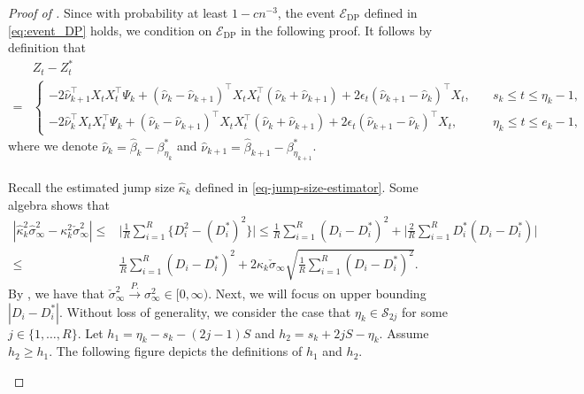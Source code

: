 \documentclass[11pt]{article}
\theoremstyle{plain}
\theoremstyle{definition}
\begin{document}
\begin{proof}[Proof of ]
Since with probability at least $1 - cn^{-3}$, the event $\mathcal{E}_{\mathrm{DP}}$ defined in \eqref{eq:event_DP} holds, we condition on $\mathcal{E}_{\mathrm{DP}}$ in the following proof. 
It follows by definition that
\begin{align*}
    &Z_t - Z_t^*\\
    =& \begin{cases}
         -2\widehat{ \nu}_{k+1}^{\top}X_tX_t^{\top}\Psi_k + (\widehat{ \nu}_k -\widehat{ \nu}_{k+1})^{\top}X_tX_t^{\top}(\widehat{ \nu}_k +\widehat{ \nu}_{k+1}) + 2\epsilon_t(\widehat{ \nu}_{k+1} - \widehat{ \nu}_k)^{\top}X_t, \quad& s_k \leq t \leq \eta_k-1,\\
        -2\widehat{ \nu}_k^{\top}X_tX_t^{\top}\Psi_k  + (\widehat{ \nu}_k -\widehat{ \nu}_{k+1})^{\top}X_tX_t^{\top}(\widehat{ \nu}_k +\widehat{ \nu}_{k+1}) + 2\epsilon_t(\widehat{ \nu}_{k+1} - \widehat{ \nu}_k)^{\top}X_t, \quad& \eta_k \leq t \leq e_k-1,
    \end{cases}
\end{align*}
where we denote $\widehat{ \nu}_{k} = \widehat{\beta}_k - \beta_{\eta_k}^*$ and $\widehat{ \nu}_{k+1} = \widehat{\beta}_{k+1} - \beta_{\eta_{k+1}}^*$.
\\
\\
Recall the estimated jump size $\widehat{\kappa}_k$ defined in \eqref{eq-jump-size-estimator}. Some algebra shows that 
\begin{align}\label{eq:weighted_lrv_diff}
    |\widehat{\kappa}_k^2\widehat{\sigma}_{\infty}^2 - \kappa_k^2\check{\sigma}_{\infty}^2| \leq& \bigg|\frac{1}{R}\sum_{i = 1}^R\big\{D_i^2 - (D_i^*)^2\big\}\bigg| \leq \frac{1}{R}\sum_{i = 1}^R(D_i - D_i^*)^2 + \bigg|\frac{2}{R}\sum_{i = 1}^R D_i^*(D_i - D_i^*)\bigg|\nonumber\\
    \leq& \frac{1}{R}\sum_{i = 1}^R(D_i - D_i^*)^2 + 2\kappa_k\check{\sigma}_{\infty}\sqrt{\frac{1}{R}\sum_{i = 1}^R(D_i - D_i^*)^2}.
\end{align}
By , we have that $\check{\sigma}_{\infty}^2 \overset{P.}{\to} \sigma_{\infty}^2 \in [0, \infty)$. Next, we will focus on upper bounding $|D_i - D_i^*|$.
Without loss of generality, we consider the case that $\eta_k \in \mathcal{S}_{2j}$ for some $j \in \{1, \dots, R\}$. Let $h_1 = \eta_k - s_k - (2j-1)S$ and $h_2 = s_k+2jS - \eta_k$. Assume $h_2 \geq h_1$. The following figure depicts the definitions of $h_1$ and $h_2$.
\begin{center}

\end{center}
\end{proof}
\end{document}
